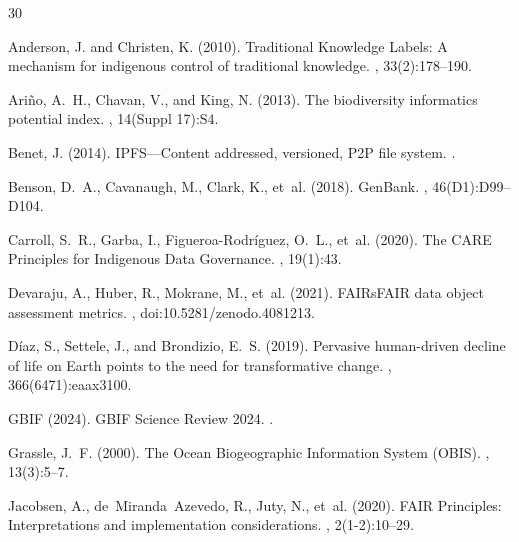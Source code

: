 \begin{thebibliography}{30}

Anderson, J. and Christen, K. (2010).
\newblock Traditional Knowledge Labels: A mechanism for indigenous control of traditional knowledge.
, 33(2):178--190.

Ari\~{n}o, A.~H., Chavan, V., and King, N. (2013).
\newblock The biodiversity informatics potential index.
, 14(Suppl 17):S4.

Benet, J. (2014).
\newblock IPFS---Content addressed, versioned, P2P file system.
.

Benson, D.~A., Cavanaugh, M., Clark, K., et~al. (2018).
\newblock GenBank.
, 46(D1):D99--D104.

Carroll, S.~R., Garba, I., Figueroa-Rodr\'{i}guez, O.~L., et~al. (2020).
\newblock The CARE Principles for Indigenous Data Governance.
, 19(1):43.

Devaraju, A., Huber, R., Mokrane, M., et~al. (2021).
\newblock FAIRsFAIR data object assessment metrics.
, doi:10.5281/zenodo.4081213.

D\'{i}az, S., Settele, J., and Brondizio, E.~S. (2019).
\newblock Pervasive human-driven decline of life on Earth points to the need for transformative change.
, 366(6471):eaax3100.

GBIF (2024).
\newblock GBIF Science Review 2024.
.

Grassle, J.~F. (2000).
\newblock The Ocean Biogeographic Information System (OBIS).
, 13(3):5--7.

Jacobsen, A., de~Miranda~Azevedo, R., Juty, N., et~al. (2020).
\newblock FAIR Principles: Interpretations and implementation considerations.
, 2(1-2):10--29.


\end{thebibliography}
